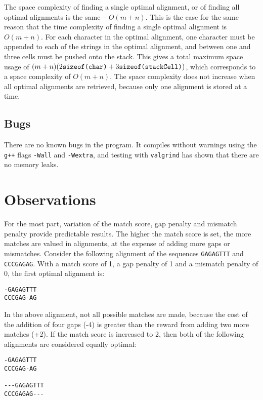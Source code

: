 \documentclass[a4paper]{report}
\begin{document}
The space complexity of finding a single optimal alignment, or of finding all optimal
alignments is the same -- $O(m + n)$. This is the case for the same reason that the time
complexity of finding a single optimal alignment is $O(m + n)$. For each character in the
optimal alignment, one character must be appended to each of the strings in the optimal alignment,
and between one and three cells must be pushed onto the stack. This gives a total maximum
space usage of $(m + n)(2 \verb=sizeof(char)= + 3 \verb=sizeof(stackCell)=)$, which corresponds to a space
complexity of $O(m + n)$. The space complexity does not increase when all optimal alignments are
retrieved, because only one alignment is stored at a time.



\subsection*{Bugs}

There are no known bugs in the program. It compiles without warnings using
the \verb=g++= flags \verb=-Wall= and \verb=-Wextra=, and
testing with \verb=valgrind= has shown that there are no memory leaks.

\section*{Observations}

For the most part, variation of the match score, gap penalty and mismatch penalty provide
predictable results. The higher the match score is set, the more matches are valued in alignments, at
the expense of adding more gaps or mismatches. Consider the following alignment of the sequences
\verb=GAGAGTTT= and \verb=CCCGAGAG=. With a match score of 1, a gap penalty of 1 and a mismatch penalty of
0, the first optimal alignment is:

\begin{verbatim}
-GAGAGTTT
CCCGAG-AG
\end{verbatim}

In the above alignment, not all possible matches are made, because the cost of the addition of four gaps (-4) is
greater than the reward from adding two more matches (+2). If the match score is increased to 2, then both of the
following alignments are considered equally optimal:

\begin{verbatim}
-GAGAGTTT
CCCGAG-AG

---GAGAGTTT
CCCGAGAG---
\end{verbatim}
\end{document}
